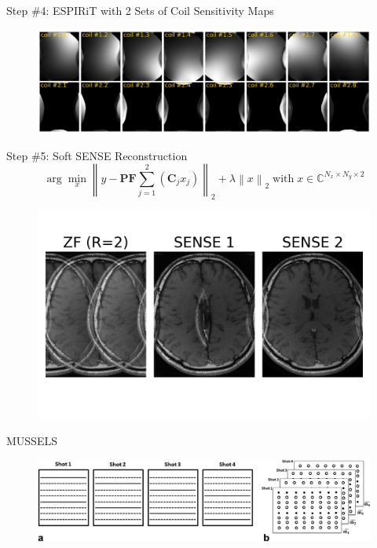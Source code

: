 \documentclass[aspectratio=169]{beamer}
\newcommand*{\norm}[1]{\left\lVert#1\right\rVert}
\newcommand{\argmin}{\arg\!\min}
\begin{document}
	\begin{frame}{Step \#4: ESPIRiT with 2 Sets of Coil Sensitivity Maps}
		\begin{figure}
			\centering
			\includegraphics[width=\textwidth]{figures/espirit_coil2.png}
		\end{figure}
	\end{frame}
	
	\begin{frame}{Step \#5: Soft SENSE Reconstruction}
		\begin{equation}
			\argmin_x \norm{y - \mathbf{P} \mathbf{F} \sum_{j=1}^2 (\mathbf{C}_j x_j)}_2 + \lambda \norm{x}_2 \; \text{with} \; x \in \mathbb{C}^{N_x \times N_y \times 2}
		\end{equation}
		
		\begin{figure}
			\centering
			\includegraphics[height=0.80\textheight]{figures/espirit_sense2.png}
		\end{figure}
	\end{frame}
	
	\begin{frame}{MUSSELS}
		\begin{figure}
			\centering
			\includegraphics[width=\textwidth]{figures/mrm26382-fig-0001-m.jpg}
		\end{figure}
	\end{frame}
\end{document}
